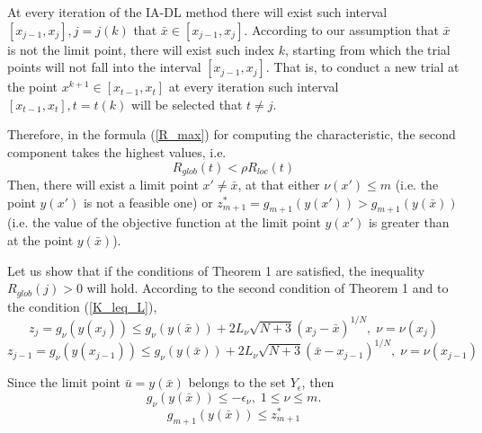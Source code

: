 \documentclass[review]{elsarticle}
\begin{document}
	At every iteration of the IA-DL method there will exist such interval $[x_{j-1}, x_j], j=j(k)$ that $\bar x \in [x_{j-1}, x_j]$. According to our assumption that $\bar x$ is not the limit point, there will exist such index $k$, starting from which the trial points will not fall into the interval $[x_{j-1}, x_j]$. That is, to conduct a new trial at the point $x^{k+1} \in [x_{t-1}, x_t]$ at every iteration such interval $[x_{t-1}, x_t], t=t(k)$ will be selected that $t \neq j$.

	Therefore, in the formula (\ref{R_max}) for computing the characteristic, the second component takes the highest values, i.e. 
$$
	R_{glob}(t) < \rho R_{loc}(t)
$$
Then, there will exist a limit point $x' \neq \bar x$, at that either $\nu(x') \leq m$ (i.e. the point $y(x')$ is not a feasible one) or $z_{m+1}^\ast =g_{m+1}(y(x'))>g_{m+1}(y(\bar x))$ (i.e. the value of the objective function at the limit point $y(x')$ is greater than at the point $y(\bar x)$).

	Let us show that if the conditions of Theorem 1 are satisfied, the inequality $R_{glob}(j)>0$ will hold. According to the second condition of Theorem 1 and to the condition (\ref{K_leq_L}), 
$$
	z_j=g_{\nu}\left( y(x_j) \right) \leq g_{\nu}\left( y(\bar x) \right) + 2L_{\nu}\sqrt{N+3}(x_j-\bar x)^{1/N}, \; \nu=\nu(x_j)
$$
$$
	z_{j-1}=g_{\nu}\left( y(x_{j-1}) \right) \leq g_{\nu}\left( y(\bar x) \right) + 2L_{\nu}\sqrt{N+3}(\bar x - x_{j-1})^{1/N}, \; \nu=\nu(x_{j-1})
$$

	Since the limit point $\bar u = y(\bar x)$ belongs to the set $Y_{\epsilon}$, then
$$
	g_{\nu}\left( y(\bar x) \right) \leq -\epsilon_{\nu}, \; 1\leq\nu\leq m.
$$
$$
	g_{m+1}\left( y(\bar x) \right) \leq z_{m+1}^*
$$
\end{document}
